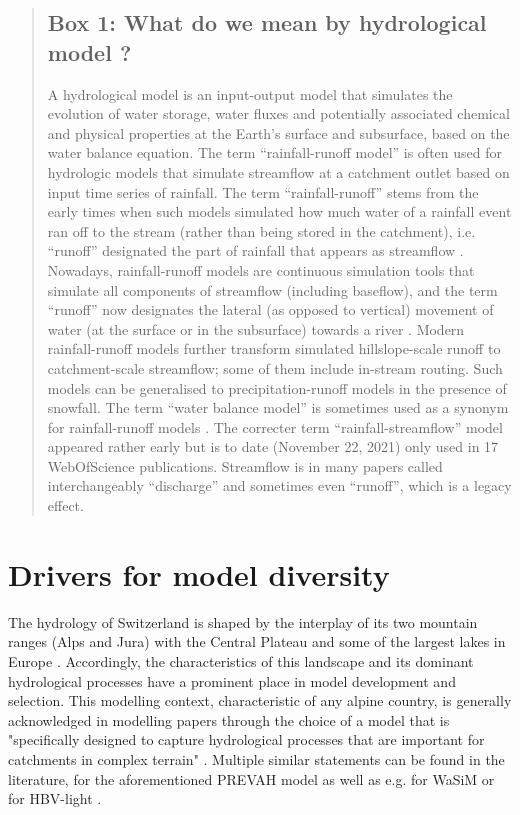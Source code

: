 \documentclass[10pt,a4paper]{article}
\begin{document}
\begin{quote}
\subsection*{Box 1: What do we mean by hydrological model ?}
\label{box:1}

A hydrological model is an input-output model that simulates the evolution of water storage, water fluxes and potentially associated chemical and physical properties at the Earth's surface and subsurface, based on the water balance equation. The term ``rainfall-runoff model'' is often used for hydrologic models that simulate streamflow at a catchment outlet based on input time series of rainfall. The term ``rainfall-runoff'' stems from the early times when such models simulated how much water of a rainfall event ran off to the stream (rather than being stored in the catchment), i.e. ``runoff'' designated the part of rainfall that appears as streamflow \citep{WMO1992}. Nowadays, rainfall-runoff models are continuous simulation tools that simulate all components of streamflow (including baseflow), and the term ``runoff'' now designates the lateral (as opposed to vertical) movement of water (at the surface or in the subsurface) towards a river \citep{WMO2012}. Modern rainfall-runoff models further transform simulated hillslope-scale runoff to catchment-scale streamflow; some of them include in-stream routing. Such models can be generalised to precipitation-runoff models in the presence of snowfall. The term ``water balance model'' is sometimes used as a synonym for rainfall-runoff models \citep{Boughton2004}. The correcter term ``rainfall-streamflow'' model appeared rather early \citep{Young1991} but is to date (November 22, 2021) only used in 17 WebOfScience publications. Streamflow is in many papers called interchangeably ``discharge'' and sometimes even ``runoff'', which is a legacy effect.  \end{quote}


\section{Drivers for model diversity}
\label{sec:context}

The hydrology of Switzerland is shaped by the interplay of its two mountain ranges (Alps and Jura) with the Central Plateau and some of the largest lakes in Europe \citep{Michel2020}. Accordingly, the characteristics of this landscape and its dominant hydrological processes have a prominent place in model development and selection. This modelling context, characteristic of any alpine country, is generally acknowledged in modelling papers through the choice of a model that is "specifically designed to capture hydrological processes that are important for catchments in complex terrain" \citep[][refering to the PREVAH model]{Anghileri2019}. Multiple similar statements can be found in the literature, for the aforementioned PREVAH model \citep{Verbunt2007, Zappa2007a, Koplin2010,  Brunner2019e} as well as e.g. for WaSiM \citep{Jasper2002, Jasper2003, Thornton2021} or for HBV-light \citep{SikorskaSenoner2020}. 
\end{document}
